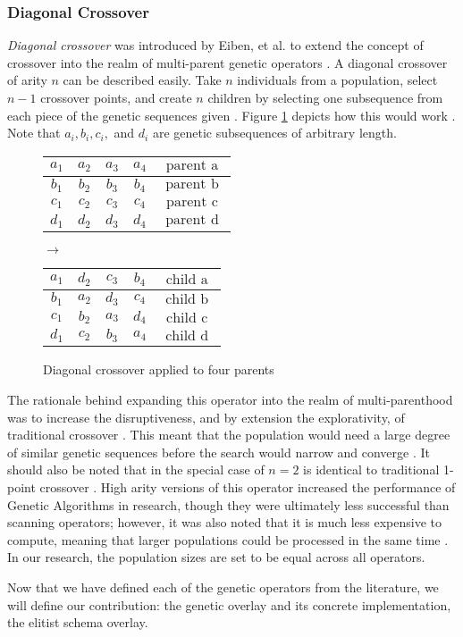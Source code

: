 \subsubsection*{Diagonal Crossover}
\emph{Diagonal crossover} was introduced by Eiben, et al. to extend the concept of crossover into the realm of multi-parent genetic operators \cite{Eiben03}. A diagonal crossover of arity $n$ can be described easily. Take $n$ individuals from a population, select $n-1$ crossover points, and create $n$ children by selecting one subsequence from each piece of the genetic sequences given \cite{Eiben95}. Figure \ref{DC-Fig} depicts how this would work \cite{Eiben95}. Note that $a_i, b_i, c_i,$ and $d_i$ are genetic subsequences of arbitrary length.
\begin{figure}[h!]
\centering
\begin{tabular}{ | c | c | c | c | c | }
\hline
{\color{myred}$a_1$} & {\color{myred}$a_2$} & {\color{myred}$a_3$} & {\color{myred}$a_4$} & $\text{ parent a }$ 	\\ \hline
{\color{myblue}$b_1$} & {\color{myblue}$b_2$} & {\color{myblue}$b_3$} & {\color{myblue}$b_4$} & $\text{ parent b }$ 	\\ \hline
{\color{mygreen}$c_1$} & {\color{mygreen}$c_2$} & {\color{mygreen}$c_3$} & {\color{mygreen}$c_4$} & $\text{ parent c }$ 	\\ \hline
$d_1$ & $d_2$ & $d_3$ & $d_4$ & $\text{ parent d }$ 	\\ \hline
\end{tabular}
$\rightarrow$
\begin{tabular}{ | c | c | c | c | c | }
\hline
{\color{myred}$a_1$} & $d_2$ & {\color{mygreen}$c_3$} & {\color{myblue}$b_4$} & $\text{ child a }$ 	\\ \hline
{\color{myblue}$b_1$} & {\color{myred}$a_2$} & $d_3$ & {\color{mygreen}$c_4$} & $\text{ child b }$ 	\\ \hline
{\color{mygreen}$c_1$} & {\color{myblue}$b_2$} & {\color{myred}$a_3$} & $d_4$ & $\text{ child c }$ 	\\ \hline
$d_1$ & {\color{mygreen}$c_2$} & {\color{myblue}$b_3$} & {\color{myred}$a_4$} & $\text{ child d }$ 	\\ \hline
\end{tabular}
\caption{Diagonal crossover applied to four parents}
\label{DC-Fig}
\end{figure} 

The rationale behind expanding this operator into the realm of multi-parenthood was to increase the disruptiveness, and by extension the explorativity, of traditional crossover \cite{Eiben97}. This meant that the population would need a large degree of similar genetic sequences before the search would narrow and converge \cite{Eiben95}. It should also be noted that in the special case of $n = 2$ is identical to traditional 1-point crossover \cite{Eiben95}. High arity versions of this operator increased the performance of Genetic Algorithms in research, though they were ultimately less successful than scanning operators; however, it was also noted that it is much less expensive to compute, meaning that larger populations could be processed in the same time \cite{Eiben95}. In our research, the population sizes are set to be equal across all operators.

Now that we have defined each of the genetic operators from the literature, we will define our contribution: the genetic overlay and its concrete implementation, the elitist schema overlay.